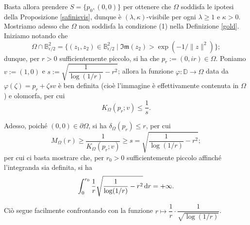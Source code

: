 Basta allora prendere $S=\{p_0,(0,0)\}$ per ottenere che $\Omega$ soddisfa le ipotesi della Proposizione \ref{safinisvis}, dunque è $(\lambda,\kappa)$-visibile per ogni $\lambda\ge 1$ e $\kappa>0$. \\

Mostriamo adesso che $\Omega$ non soddisfa la condizione (1) nella Definizione \ref{gold}. Iniziamo notando che
$$\Omega\cap\mathbb{B}^2_{\epsilon/2}=\{(z_1,z_2)\in\mathbb{B}^2_{\epsilon/2}\mid \mathfrak{Im}(z_2)>\exp(-1/\|z\|^2)\};$$
dunque, per $r>0$ sufficientemente piccolo, si ha che $p_r:=(0,ir)\in\Omega$. Poniamo $v:=(1,0)$ e $s:=\sqrt{\dfrac{1}{\log(1/r)}-r^2}$; allora la funzione $\varphi:\mathbb{D}\longrightarrow\Omega$ data da $\varphi(\zeta)=p_r+\zeta sv$ è ben definita (cioè l'immagine è effettivamente contenuta in $\Omega$) e olomorfa, per cui
$$K_\Omega(p_r;v) \le \frac{1}{s}.$$

Adesso, poiché $(0,0)\in\partial\Omega$, si ha $\delta_\Omega(p_r) \le r$, per cui
$$M_\Omega(r) \ge \frac{1}{K_\Omega(p_r;v)} \ge s=\sqrt{\frac{1}{\log(1/r)}-r^2};$$
per cui ci basta mostrare che, per $r_0>0$ sufficientemente piccolo affinché l'integranda sia definita, si ha
$$\int_0^{r_0}\frac{1}{r}\sqrt{\frac{1}{\log(1/r)}-r^2}\mathop{}\!\mathrm{d} r=+\infty.$$

Ciò segue facilmente confrontando con la funzione $r \longmapsto \dfrac{1}{r}\cdot\dfrac{1}{\sqrt{\log(1/r)}}$.